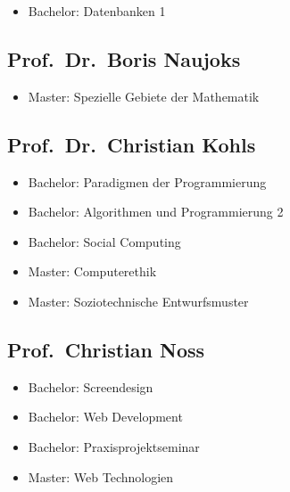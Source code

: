 \begin{itemize}
\tightlist
\item
  Bachelor: Datenbanken 1
\end{itemize}

\subsection{Prof.~Dr.~Boris
Naujoks\label{/mi-2017/selbstbericht/0800-ausstattung/0000-ausstattung}}\label{prof.dr.boris-naujokspathlabelmi-2017selbstbericht0800-ausstattung0000-ausstattung}

\begin{itemize}
\tightlist
\item
  Master: Spezielle Gebiete der Mathematik
\end{itemize}

\subsection{Prof.~Dr.~Christian
Kohls\label{/mi-2017/selbstbericht/0800-ausstattung/0000-ausstattung}}\label{prof.dr.christian-kohlspathlabelmi-2017selbstbericht0800-ausstattung0000-ausstattung}

\begin{itemize}
\tightlist
\item
  Bachelor: Paradigmen der Programmierung
\item
  Bachelor: Algorithmen und Programmierung 2
\item
  Bachelor: Social Computing
\item
  Master: Computerethik
\item
  Master: Soziotechnische Entwurfsmuster
\end{itemize}

\subsection{Prof.~Christian
Noss\label{/mi-2017/selbstbericht/0800-ausstattung/0000-ausstattung}}\label{prof.christian-nosspathlabelmi-2017selbstbericht0800-ausstattung0000-ausstattung}

\begin{itemize}
\tightlist
\item
  Bachelor: Screendesign
\item
  Bachelor: Web Development
\item
  Bachelor: Praxisprojektseminar
\item
  Master: Web Technologien
\end{itemize}

